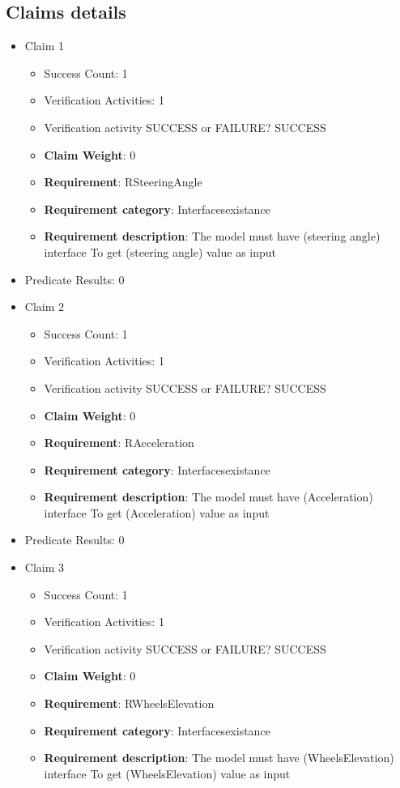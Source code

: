 \documentclass{article}
\begin{document}
			\subsection{Claims details}
			\begin{itemize}
  				  \item Claim 1
				\begin{itemize}
			    	\item Success Count: 1 
			    	\item Verification Activities: 1
					\item Verification activity SUCCESS or FAILURE? SUCCESS
					\item \textbf{Claim Weight}: 0
						\item \textbf{Requirement}: RSteeringAngle 
						\item \textbf{Requirement category}: Interfacesexistance 
						\item \textbf{Requirement description}: The model must have (steering angle) interface To get (steering angle) value as input
					
				\end{itemize}
				
									    
				\item Predicate Results: 0

  				  \item Claim 2
				\begin{itemize}
			    	\item Success Count: 1 
			    	\item Verification Activities: 1
					\item Verification activity SUCCESS or FAILURE? SUCCESS
					\item \textbf{Claim Weight}: 0
						\item \textbf{Requirement}: RAcceleration 
						\item \textbf{Requirement category}: Interfacesexistance 
						\item \textbf{Requirement description}: The model must have (Acceleration) interface To get (Acceleration) value as input
					
				\end{itemize}
				
									    
				\item Predicate Results: 0

  				  \item Claim 3
				\begin{itemize}
			    	\item Success Count: 1 
			    	\item Verification Activities: 1
					\item Verification activity SUCCESS or FAILURE? SUCCESS
					\item \textbf{Claim Weight}: 0
						\item \textbf{Requirement}: RWheelsElevation 
						\item \textbf{Requirement category}: Interfacesexistance 
						\item \textbf{Requirement description}: The model must have (WheelsElevation) interface To get (WheelsElevation) value as input
					

\end{itemize}
\end{itemize}
\end{document}
